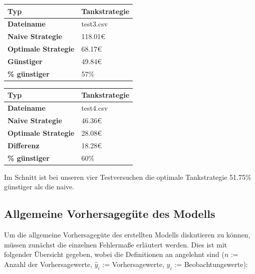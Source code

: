 \documentclass[
ngerman          %
,a4paper          %
,11pt
,pdftex
]{report}
\begin{document}
\begin{table}[H]
	\centering
	\begin{tabular}{l l}
		\textbf{Typ} & \textbf{Tankstrategie} \\ 
		\hline
		\hline
		\textbf{Dateiname} & test3.csv \\
        \textbf{Naive Strategie} & 118.01\euro{} \\
        \textbf{Optimale Strategie} & 68.17\euro{} \\
  		\textbf{Günstiger} & 49.84\euro{} \\
        \textbf{\% günstiger} & 57\% \\
		\hline 
	\end{tabular}
\end{table} 

\begin{table}[H]
	\centering
	\begin{tabular}{l l}
		\textbf{Typ} & \textbf{Tankstrategie} \\ 
		\hline
		\hline
		\textbf{Dateiname} & test4.csv \\
        \textbf{Naive Strategie} & 46.36\euro{} \\
        \textbf{Optimale Strategie} & 28.08\euro{} \\
  		\textbf{Differenz} & 18.28\euro{} \\
        \textbf{\% günstiger} & 60\% \\
		\hline 
	\end{tabular}
\end{table} 

Im Schnitt ist bei unseren vier Testversuchen die optimale Tankstrategie 51.75\% günstiger als die naive.

\subsection{Allgemeine Vorhersagegüte des Modells}

Um die allgemeine Vorhersagegüte des erstellten Modells diskutieren zu können, müssen zunächst die einzelnen Fehlermaße erläutert werden. Dies ist mit folgender Übersicht gegeben, wobei die Definitionen an \cite{maermse} angelehnt sind ($n$ := Anzahl der Vorhersagewerte, $\hat{y}_i$ := Vorhersagewerte, $y_i$ := Beobachtungswerte):
\end{document}
